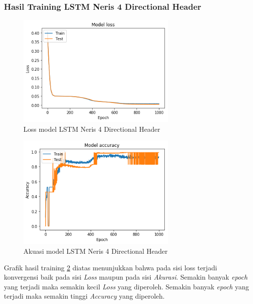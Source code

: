 \documentclass[./skripsi.tex]{subfiles}
\begin{document}
\subsubsection{Hasil Training LSTM Neris 4 Directional Header}
\begin{figure}
    \centering
    \includegraphics[width=0.7\textwidth]{public/assets/img/lstm4_neris_loss.png}
    \caption{Loss model LSTM Neris 4 Directional Header}
    \label{fig:lstm4_neris_loss}
\end{figure}
\begin{figure}%
    \centering
    \includegraphics[width=0.7\textwidth]{public/assets/img/lstm4_neris_acc.png}
    \caption{Akuasi model LSTM Neris 4 Directional Header}
    \label{fig:lstm4_neris}
\end{figure}

\par Grafik hasil training \ref{fig:lstm4_neris} diatas menunjukkan bahwa pada sisi loss terjadi konvergensi baik pada sisi \textit{Loss} maupun pada sisi \textit{Akurasi}. Semakin banyak \textit{epoch} yang terjadi maka semakin kecil \textit{Loss} yang diperoleh. Semakin banyak \textit{epoch} yang terjadi maka semakin tinggi \textit{Accuracy} yang diperoleh.
\end{document}

